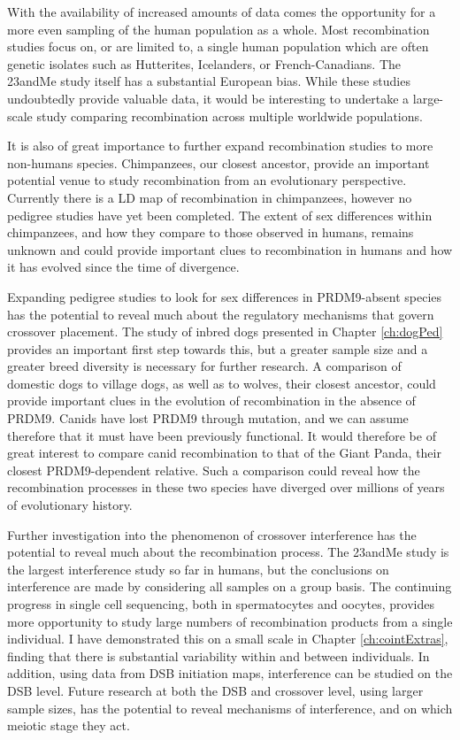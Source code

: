 With the availability of increased amounts of data comes the opportunity for a more even sampling of the human population as a whole.
Most recombination studies focus on, or are limited to, a single human population which are often genetic isolates such as Hutterites\cite{Coop2008}, Icelanders\cite{Kong2010}, or French-Canadians\cite{Hussin2011}.
The 23andMe study itself has a substantial European bias.
While these studies undoubtedly provide valuable data, it would be interesting to undertake a large-scale study comparing recombination across multiple worldwide populations.

It is also of great importance to further expand recombination studies to more non-humans species.
Chimpanzees, our closest ancestor, provide an important potential venue to study recombination from an evolutionary perspective.
Currently there is a LD map of recombination in chimpanzees\cite{Auton2012a}, however no pedigree studies have yet been completed.
The extent of sex differences within chimpanzees, and how they compare to those observed in humans, remains unknown and could provide important clues to recombination in humans and how it has evolved since the time of divergence.

Expanding pedigree studies to look for sex differences in PRDM9-absent species has the potential to reveal much about the regulatory mechanisms that govern crossover placement.
The study of inbred dogs presented in Chapter \ref{ch:dogPed} provides an important first step towards this, but a greater sample size and a greater breed diversity is necessary for further research.
A comparison of domestic dogs to village dogs, as well as to wolves, their closest ancestor, could provide important clues in the evolution of recombination in the absence of PRDM9.
Canids have lost PRDM9 through mutation, and we can assume therefore that it must have been previously functional.
It would therefore be of great interest to compare canid recombination to that of the Giant Panda, their closest PRDM9-dependent relative.
Such a comparison could reveal how the recombination processes in these two species have diverged over millions of years of evolutionary history.

Further investigation into the phenomenon of crossover interference has the potential to reveal much about the recombination process.
The 23andMe study is the largest interference study so far in humans, but the conclusions on interference are made by considering all samples on a group basis.
The continuing progress in single cell sequencing, both in spermatocytes and oocytes, provides more opportunity to study large numbers of recombination products from a single individual.
I have demonstrated this on a small scale in Chapter \ref{ch:cointExtras}, finding that there is substantial variability within and between individuals.
In addition, using data from DSB initiation maps\cite{Pratto2014}, interference can be studied on the DSB level.
Future research at both the DSB and crossover level, using larger sample sizes, has the potential to reveal mechanisms of interference, and on which meiotic stage they act.

